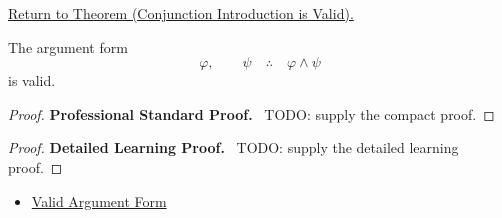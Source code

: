 \newpage
{}
\label{prf:conjunction-introduction-validity-propositional-logic}

\begin{remark*}[Return]
\hyperref[thm:conjunction-introduction-validity-propositional-logic]{Return to Theorem (Conjunction Introduction is Valid).}
\end{remark*}

\begin{theorem*}
The argument form
\[
\varphi,\qquad \psi \quad\therefore\quad \varphi\land\psi
\]
is valid.
\end{theorem*}

\begin{proof}
\textbf{Professional Standard Proof.}~
TODO: supply the compact proof.
\end{proof}

\begin{proof}
\textbf{Detailed Learning Proof.}~
TODO: supply the detailed learning proof.
\end{proof}

\begin{remark*}
\end{remark*}

\begin{dependencies}
\begin{itemize}
  \item \hyperref[def:valid-argument-form-propositional-logic]{Valid Argument Form}
\end{itemize}
\end{dependencies}

\clearpage
